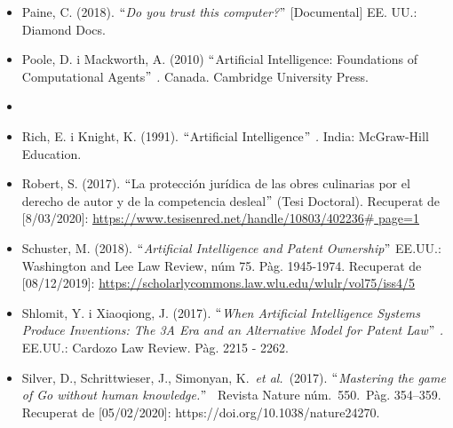 \documentclass[12pt]{article}
\renewcommand{\_}{\kern-1.5pt\textunderscore\kern-1.5pt}
\begin{document}
\begin{itemize}
\begin{itemize}
\vspace{\baselineskip}
	\item Paine, C. (2018). $``$\textit{Do you trust this computer?$"$  }[Documental] EE. UU.: Diamond Docs.\par


\vspace{\baselineskip}
	\item Poole, D. i Mackworth, A. (2010) $``$Artificial Intelligence: Foundations of Computational Agents$"$ \textit{. }Canada. Cambridge University Press.\par


\vspace{\baselineskip}
	\item \par


\vspace{\baselineskip}
	\item Rich, E. i Knight, K. (1991). $``$Artificial Intelligence\textit{$"$ . }India:\textit{ }McGraw-Hill Education. \par


\vspace{\baselineskip}
	\item Robert, S. (2017). $``$La protección jurídica de las obres culinarias por el derecho de autor y de la competencia desleal$"$ \textit{ }(Tesi Doctoral). Recuperat de [8/03/2020]: \href{https://www.tesisenred.net/handle/10803/402236}{\textcolor[HTML]{0000FF}{\ul{https://www.tesisenred.net/handle/10803/402236$\#$ page=1}}}\par


\vspace{\baselineskip}
	\item Schuster, M. (2018). $``$\textit{Artificial Intelligence and Patent Ownership$"$ } EE.UU.: Washington and Lee Law Review, núm 75. Pàg. 1945-1974. Recuperat de [08/12/2019]: \href{https://scholarlycommons.law.wlu.edu/wlulr/vol75/iss4/5}{https://scholarlycommons.law.wlu.edu/wlulr/vol75/iss4/5}\par


\vspace{\baselineskip}
	\item Shlomit, Y. i Xiaoqiong, J. (2017). \textit{ $``$When Artificial Intelligence Systems Produce Inventions: The 3A Era and an Alternative Model for Patent Law$"$ .} EE.UU.:\textit{ }Cardozo Law Review. Pàg. 2215 - 2262.\par


\vspace{\baselineskip}
	\item \textcolor[HTML]{222222}{Silver, D., Schrittwieser, J., Simonyan, K. \textit{et al.} (2017). $``$\textit{Mastering the game of Go without human knowledge.}$"$  Revista Nature núm. 550. Pàg. 354–359. Recuperat de [05/02/2020]: \href{https://doi.org/10.1038/nature24270}{}https://doi.org/10.1038/nature24270}\textcolor[HTML]{222222}{. }\par



\end{itemize}
\end{itemize}
\end{document}
